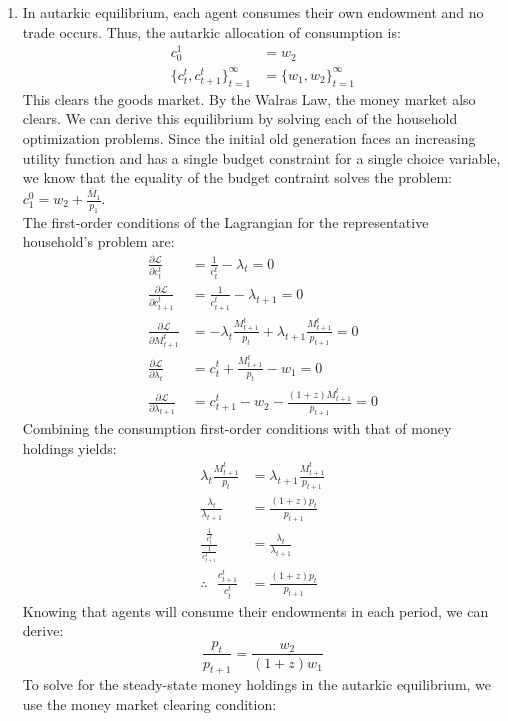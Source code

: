 \documentclass{article}
\renewcommand{\L}{\mathcal{L}}
\begin{document}
\begin{enumerate}
	\item In autarkic equilibrium, each agent consumes their own endowment and no trade occurs. Thus, the autarkic allocation of consumption is:
		\begin{align*}
										c_0^1	&= w_2 	\\
			\{c_t^t,c_{t+1}^t\}_{t=1}^\infty	&= \{w_1,w_2\}_{t=1}^\infty
		\end{align*}
		This clears the goods market. By the Walras Law, the money market also clears. We can derive this equilibrium by solving each of the household optimization problems. Since the initial old generation faces an increasing utility function and has a single budget constraint for a single choice variable, we know that the equality of the budget contraint solves the problem: $c_1^0 = w_2 + \frac{\overline{M}_1}{p_1}$.
		\medskip \\
		The first-order conditions of the Lagrangian for the representative household's problem are:
		\begin{align*}
			\frac{\partial\L}{\partial c_t^t} 			&= \frac{1}{c_t^t} 		- \lambda_t 	= 0 \\
			\frac{\partial\L}{\partial c_{t+1}^t} 		&= \frac{1}{c_{t+1}^t} 	- \lambda_{t+1} = 0 \\
			\frac{\partial\L}{\partial M_{t+1}^t}		&= -\lambda_t\frac{M_{t+1}^t}{p_t} + \lambda_{t+1}\frac{M_{t+1}^t}{p_{t+1}} 	= 0 \\
			\frac{\partial\L}{\partial \lambda_t} 		&= c_t^t + \frac{M_{t+1}^t}{p_t} - w_1	= 0	\\
			\frac{\partial\L}{\partial \lambda_{t+1}} 	&= c_{t+1}^t -w_2 - \frac{(1+z)M_{t+1}^t}{p_{t+1}} = 0	
		\end{align*}
		Combining the consumption first-order conditions with that of money holdings yields:
		\begin{align*}
			\lambda_t\frac{M_{t+1}^t}{p_t} 				&= \lambda_{t+1}\frac{M_{t+1}^t}{p_{t+1}}  \\
			\frac{\lambda_t}{\lambda_{t+1}} 			&= \frac{(1+z)p_t}{p_{t+1}}					\\
			\frac{\frac{1}{c_t^t}}{\frac{1}{c_{t+1}^t}} &= \frac{\lambda_t}{\lambda_{t+1}}			\\
			\therefore\text{ }\frac{c^t_{t+1}}{c_t^t} 	&= \frac{(1+z)p_t}{p_{t+1}}
		\end{align*}
		Knowing that agents will consume their endowments in each period, we can derive:
		\[
			\frac{p_t}{p_{t+1}} = \frac{w_2}{(1+z)w_1}
		\]
		To solve for the steady-state money holdings in the autarkic equilibrium, we use the money market clearing condition:

\end{enumerate}
\end{document}
